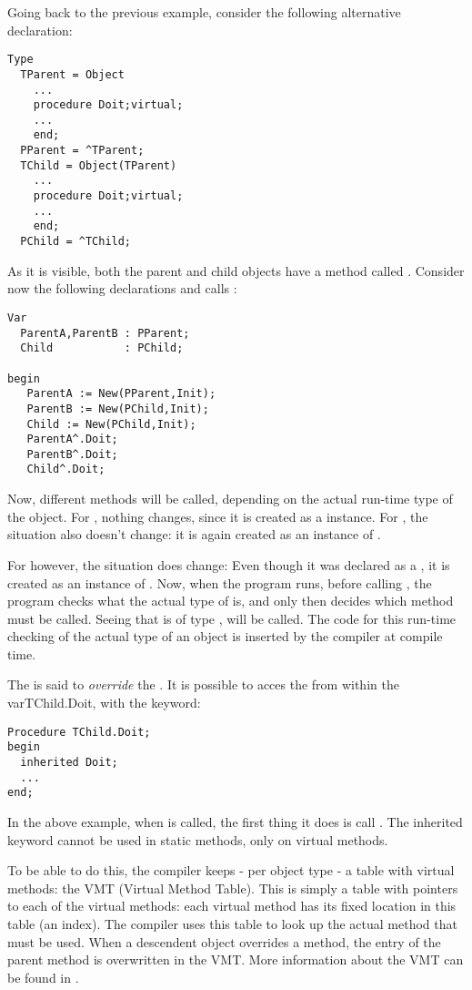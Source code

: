 Going back to the previous example, consider the following alternative
declaration:
\begin{verbatim}
Type
  TParent = Object
    ...
    procedure Doit;virtual;
    ...
    end;
  PParent = ^TParent;
  TChild = Object(TParent)
    ...
    procedure Doit;virtual;
    ...
    end;
  PChild = ^TChild;
\end{verbatim}
As it is visible, both the parent and child objects have a method called
. Consider now the following declarations and calls :
\begin{verbatim}
Var 
  ParentA,ParentB : PParent;
  Child           : PChild;

begin
   ParentA := New(PParent,Init);
   ParentB := New(PChild,Init);
   Child := New(PChild,Init);
   ParentA^.Doit;
   ParentB^.Doit;
   Child^.Doit;
\end{verbatim}
Now, different methods will be called, depending on the actual run-time type
of the object. For , nothing changes, since it is created as
a  instance. For , the situation also doesn't
change: it is again created as an instance of .

For  however, the situation does change: Even though it was
declared as a , it is created as an instance of .
Now, when the program runs, before calling , the program
checks what the actual type of  is, and only then decides which
method must be called. Seeing that  is of type ,
 will be called. The code for this run-time checking of the actual type of an object is
inserted by the compiler at compile time.

The  is said to {\em override} the
.
It is possible to acces the  from within the
var{TChild.Doit}, with the  keyword:
\begin{verbatim}
Procedure TChild.Doit;
begin
  inherited Doit;
  ...
end;
\end{verbatim}
In the above example, when  is called, the first thing it
does is call .  The inherited keyword cannot be used in
static methods, only on virtual methods.

To be able to do this, the compiler keeps - per object type - a table with
virtual methods: the VMT (Virtual Method Table). This is simply a table 
with pointers to each of the virtual methods: each virtual method has its
fixed location in this table (an index). The compiler uses this table to 
look up the actual method that must be used. When a descendent object
overrides a method, the entry of the parent method is overwritten in the
VMT. More information about the VMT can be found in \progref.

